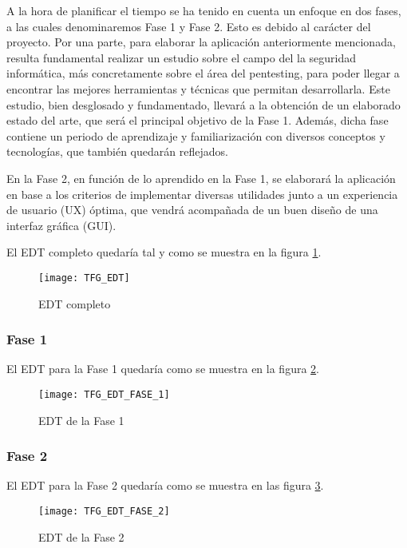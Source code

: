 A la hora de planificar el tiempo se ha tenido en cuenta un enfoque en dos fases, a las cuales denominaremos Fase 1 y Fase 2. Esto es debido al carácter del proyecto. Por una parte, para elaborar la aplicación anteriormente mencionada, resulta fundamental realizar un estudio sobre el campo del la seguridad informática, más concretamente sobre el área del pentesting, para poder llegar a encontrar las mejores herramientas y técnicas que permitan desarrollarla. Este estudio, bien desglosado y fundamentado, llevará a la obtención de un elaborado estado del arte, que será el principal objetivo de la Fase 1. Además, dicha fase contiene un periodo de aprendizaje y familiarización con diversos conceptos y tecnologías, que también quedarán reflejados.

En la Fase 2, en función de lo aprendido en la Fase 1, se elaborará la aplicación en base a los criterios de implementar diversas utilidades junto a un experiencia de usuario (UX) óptima, que vendrá acompañada de un buen diseño de una interfaz gráfica (GUI).

El EDT completo quedaría tal y como se muestra en la figura \ref{fig:edt}.

\begin{landscape}
	
	\begin{figure}[H]
		\centering
		\texttt{[image: TFG\_EDT]}
		\caption{EDT completo}
		\label{fig:edt}
	\end{figure}
	
	\clearpage
	
	\subsubsection{Fase 1}
	El EDT para la Fase 1 quedaría como se muestra en la figura \ref{fig:edt1}.
	
	\begin{figure}[H]
		\centering
		\texttt{[image: TFG\_EDT\_FASE\_1]}
		\caption{EDT de la Fase 1}
		\label{fig:edt1}
	\end{figure}

\end{landscape}

\subsubsection{Fase 2}
El EDT para la Fase 2 quedaría como se muestra en las figura \ref{fig:edt2}.

\begin{figure}[H]
	\centering
	\texttt{[image: TFG\_EDT\_FASE\_2]}
	\caption{EDT de la Fase 2}
	\label{fig:edt2}
\end{figure}

